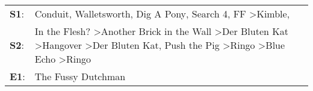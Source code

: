 \begin{supertabular}{p{0.03\textwidth}p{0.92\textwidth}}
 \textbf{S1}:  &                                                                                                                                                                                            Conduit\textsuperscript{}, \enspace Walletsworth\textsuperscript{}, \enspace Dig A Pony\textsuperscript{}, \enspace Search 4\textsuperscript{}, \enspace FF\textsuperscript{} \textgreater \enspace Kimble\textsuperscript{}, \textsuperscript{}  \enspace  \\
 \textbf{S2}:  &  In the Flesh?\textsuperscript{} \textgreater \enspace Another Brick in the Wall\textsuperscript{} \textgreater \enspace Der Bluten Kat\textsuperscript{} \textgreater \enspace Hangover\textsuperscript{} \textgreater \enspace Der Bluten Kat\textsuperscript{}, \enspace Push the Pig\textsuperscript{} \textgreater \enspace Ringo\textsuperscript{} \textgreater \enspace Blue Echo\textsuperscript{} \textgreater \enspace Ringo\textsuperscript{}  \enspace  \\
 \textbf{E1}:  &                                                                                                                                                                                                                                                                                                                                                                                                                     The Fussy Dutchman\textsuperscript{}  \enspace  \\
\end{supertabular}
